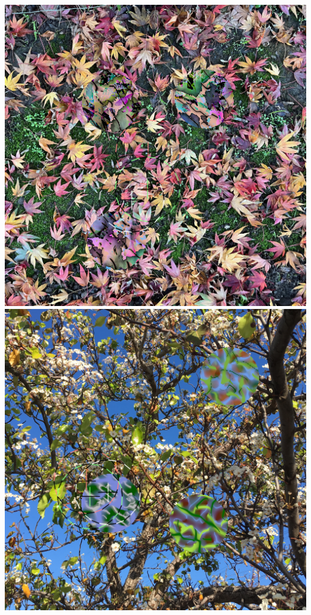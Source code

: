\documentclass[sigconf]{acmart}
\begin{document}
\begin{teaserfigure}
    \includegraphics[scale=0.24]{images/20220918_step_7372.png}
    \hfill
    \includegraphics[scale=0.24]{images/20220926_step_6143.png}

\end{teaserfigure}
\end{document}
